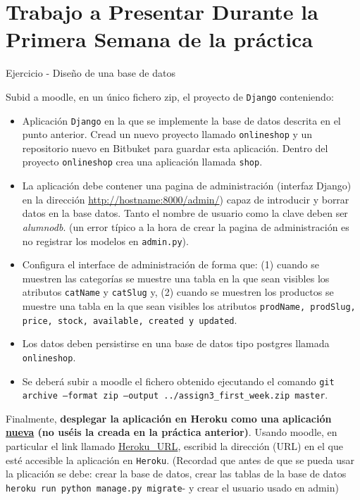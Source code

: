 \documentclass[12pt]{article} %
\newcounter{ejercicioNo}
\newcommand{\django}{\texttt{Django}}%
\newcommand{\admin}{\texttt{admin.py}}%
\newcommand{\database}{\texttt{onlineshop}}%
\newcommand{\proyecto}{\texttt{onlineshop}}%
\newcommand{\aplicacionsh}{\texttt{shop}}%
\newcommand{\heroku}{\texttt{Heroku}}
\begin{document}
     
\section{Trabajo a Presentar Durante la Primera Semana de la práctica} %

\begin{minipage}{\linewidth}
\begin{framed}
\addtocounter{ejercicioNo}{1} 
Ejercicio  - Diseño de una base de datos

Subid a moodle, en un único fichero zip, el proyecto de \django{} conteniendo: 

\begin{itemize}
 \item Aplicación \django{}  en la que se implemente la base de datos descrita en el punto anterior. Cread un nuevo proyecto llamado \proyecto{} y un repositorio nuevo en Bitbuket para guardar esta aplicación. Dentro del proyecto \proyecto{} crea una aplicación llamada \aplicacionsh. 

 \item La aplicación debe contener una pagina de administración (interfaz Django) en la direcci\'on \url{http://hostname:8000/admin/}) capaz de introducir y borrar datos en la base datos. Tanto el nombre de usuario como la clave deben ser \textit{alumnodb}. (un error típico a la hora de crear la pagina de administración es no registrar los modelos en \admin).
 
 \item Configura el interface de administración de forma que: (1) cuando se muestren las categorías se muestre una tabla en la que sean visibles los atributos \texttt{catName} y \texttt{catSlug} y, (2) cuando se muestren los productos se muestre una tabla en la que sean visibles los atributos \texttt{prodName, prodSlug, price, stock, available, created y updated}.

 
 \item Los datos deben persistirse en una base de datos tipo postgres llamada \database.

 \item Se deberá subir a moodle el fichero obtenido ejecutando el comando \texttt{git archive --format zip --output ../assign3\_first\_week.zip  master}.

 \end{itemize}

Finalmente, \textbf{desplegar la aplicación en Heroku como una aplicación \underline{nueva} (no uséis la creada en la práctica anterior)}. Usando moodle, en particular el link llamado \url{Heroku_URL}, escribid la dirección (URL) en el que esté accesible la aplicación en \heroku. (Recordad que antes de que se pueda usar la plicación se debe:  crear la base de datos, crear las tablas de la base de datos \texttt{heroku run python manage.py migrate}- y crear el usuario usado en admin)

\end{framed}
\end{minipage}
\end{document}
